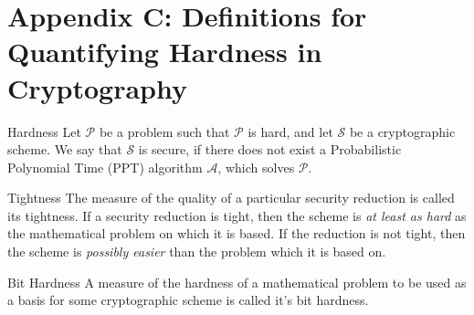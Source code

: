 \section{Appendix C: Definitions for Quantifying Hardness in Cryptography}


\begin{defn}{Hardness}
Let $\mathcal{P}$ be a problem such that $\mathcal{P}$ is hard, and let $\mathcal{S}$ be a cryptographic scheme. 
We say that $\mathcal{S}$ is secure, if there does not exist a Probabilistic Polynomial Time (PPT) algorithm $\mathcal{A}$, which solves $\mathcal{P}$. 
\end{defn}	


\begin{defn}{Tightness}
The measure of the quality of a particular security reduction is called its tightness.
If a security reduction is tight, then the scheme is \emph{at least as hard} as the mathematical problem on which it is based. 
If the reduction is not tight, then the scheme is \emph{possibly easier} than the problem which it is based on. 
\end{defn}
	

\begin{defn}{Bit Hardness}
A measure of the hardness of a mathematical problem to be used as a basis for some cryptographic scheme is called it’s bit hardness. 
\end{defn}

